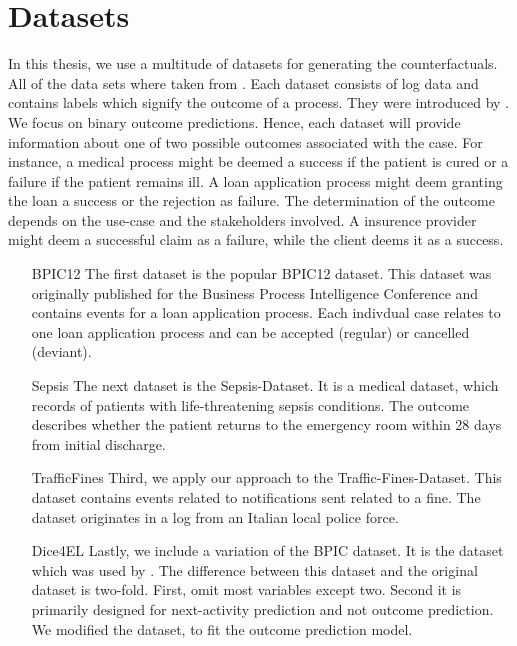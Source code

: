 \documentclass[./../../paper.tex]{subfiles}
\begin{document}
\section{Datasets}
\label{sec:dataset_description}
In this thesis, we use a multitude of datasets for generating the counterfactuals. All of the data sets where taken from \citeauthor{teinemaa_OutcomeOrientedPredictiveProcess_2018a}. Each dataset consists of log data and contains labels which signify the outcome of a process. They were introduced by . We focus on binary outcome predictions. Hence, each dataset will provide information about one of two possible outcomes associated with the case. For instance, a medical process might be deemed a success if the patient is cured or a failure if the patient remains ill. A loan application process might deem granting the loan a success or the rejection as failure. The determination of the outcome depends on the use-case and the stakeholders involved. A insurence provider might deem a successful claim as a failure, while the client deems it as a success.

\begin{enumerate}
    \item[BPIC12] The first dataset is the popular BPIC12 dataset. This dataset was originally published for the Business Process Intelligence Conference and contains events for a loan application process. Each indivdual case relates to one loan application process and can be accepted (regular) or cancelled (deviant).
    \item[Sepsis] The next dataset is the Sepsis-Dataset. It is a medical dataset, which records of patients with life-threatening sepsis conditions. The outcome describes whether the patient returns to the emergency room within 28 days from initial discharge.
    \item[TrafficFines] Third, we apply our approach to the Traffic-Fines-Dataset. This dataset contains events related to notifications sent related to a fine. The dataset originates in a log from an Italian local police force.
    \item[Dice4EL] Lastly, we include a variation of the BPIC dataset. It is the dataset which was used by \citeauthor{hsieh_DiCE4ELInterpretingProcess_2021}. The difference between this dataset and the original dataset is two-fold. First, \citeauthor{hsieh_DiCE4ELInterpretingProcess_2021} omit most variables except two. Second it is primarily designed for next-activity prediction and not outcome prediction. We modified the dataset, to fit the outcome prediction model.
\end{enumerate}
\end{document}
